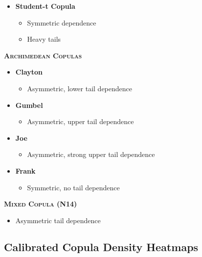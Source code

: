 \documentclass[
  letterpaper,
  DIV=11,
  numbers=noendperiod]{scrartcl}
\providecommand{\tightlist}{%
  \setlength{\itemsep}{0pt}\setlength{\parskip}{0pt}}\usepackage{longtable,booktabs,array}
\begin{document}
\begin{itemize}
\tightlist
\item
  \textbf{Student-t Copula}

  \begin{itemize}
  \tightlist
  \item
    Symmetric dependence
  \item
    Heavy tails
  \end{itemize}
\end{itemize}

\textsc{\textbf{Archimedean Copulas}}

\begin{itemize}
\tightlist
\item
  \textbf{Clayton}

  \begin{itemize}
  \tightlist
  \item
    Asymmetric, lower tail dependence
  \end{itemize}
\item
  \textbf{Gumbel}

  \begin{itemize}
  \tightlist
  \item
    Asymmetric, upper tail dependence
  \end{itemize}
\item
  \textbf{Joe}

  \begin{itemize}
  \tightlist
  \item
    Asymmetric, strong upper tail dependence
  \end{itemize}
\item
  \textbf{Frank}

  \begin{itemize}
  \tightlist
  \item
    Symmetric, no tail dependence
  \end{itemize}
\end{itemize}

\textsc{\textbf{Mixed Copula (N14) }}

\begin{itemize}
\tightlist
\item
  Asymmetric tail dependence
\end{itemize}

\subsection{Calibrated Copula Density
Heatmaps}\label{calibrated-copula-density-heatmaps}
\end{document}
